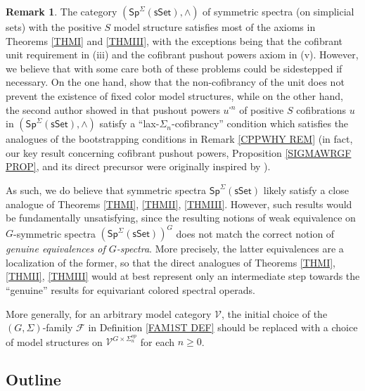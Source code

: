 \documentclass[a4paper,10pt
,draft
]{article}%
\numberwithin{equation}{section}
\numberwithin{figure}{section}
\theoremstyle{definition} %
\newtheorem{remark}[equation]{Remark}%
\newcommand{\F}{\ensuremath{\mathcal F}}
\newcommand{\V}{\ensuremath{\mathcal V}}
\newcommand{\1}{\ensuremath{\mathbbm 1}}%
\begin{document}
\begin{remark}\label{SPNONEX REM}
	The category $(\mathsf{Sp}^{\Sigma}(\mathsf{sSet}),\wedge)$
	of symmetric spectra (on simplicial sets)
	with the positive $S$ model structure
	satisfies most of the axioms in Theorems 
	\ref{THMI} and \ref{THMIII}, 
	with the exceptions being that the cofibrant unit requirement in (iii)
	and the cofibrant pushout powers axiom in (v).
	However, we believe that with some care 
	both of these problems could be sidestepped 
	if necessary. 
	On the one hand, \cite{GV12}
	show that the non-cofibrancy of the unit 
	does not prevent the existence of fixed color model structures,
	while on the other hand, 
	the second author showed in \cite{Pe16}
	that pushout powers $u^{\square n}$ of positive $S$ cofibrations $u$
	in $(\mathsf{Sp}^{\Sigma}(\mathsf{sSet}),\wedge)$
	satisfy a ``lax-$\Sigma_n$-cofibrancy'' condition 
	which satisfies the analogues of the bootstrapping conditions
	in Remark \ref{CPPWHY REM}
	(in fact, our key result concerning cofibrant pushout powers,
	Proposition \ref{SIGMAWRGF PROP}, and its direct precursor
	\cite[Prop. 6.24]{BP_geo}
	were originally inspired by \cite[Thm. 1.2]{Pe16}).

	As such, we do believe that symmetric spectra
	$\mathsf{Sp}^{\Sigma}(\mathsf{sSet})$
	likely satisfy a close analogue of Theorems 
	\ref{THMI}, \ref{THMII}, \ref{THMIII}.
	However, such results 
	would be fundamentally unsatisfying, 
	since the resulting notions of weak equivalence on
	$G$-symmetric spectra
	$\left(\mathsf{Sp}^{\Sigma}(\mathsf{sSet})\right)^G$
	does not match the correct notion of 
	\emph{genuine equivalences of $G$-spectra}.
	More precisely, the latter equivalences are a localization of the former, so that the direct analogues of 
	Theorems \ref{THMI}, \ref{THMII}, \ref{THMIII}
	would at best represent only an intermediate step
	towards the ``genuine'' results
	for equivariant colored spectral operads.

	More generally,
	for an arbitrary model category $\V$,
	the initial choice of the $(G,\Sigma)$-family $\F$ in  
	Definition \ref{FAM1ST DEF}
	should be replaced with a choice of model structures on
	$\V^{G \times \Sigma_n^{op}}$
	for each $n \geq 0$.	 
\end{remark}



\subsection{Outline}
\end{document}
